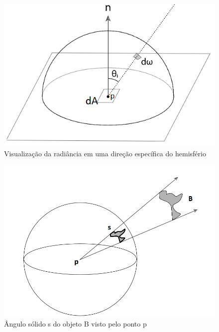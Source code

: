 \documentclass[english, 
               brazil, 
               bsc] %
               {dcomp-abntex2}
\begin{document}
\begin{figure}[h]
        \caption{\label{radiance-img} \small Visualização da radiância em uma direção específica do hemisfério}
        \begin{center}
            \includegraphics[scale=0.5]{./Imagens/irradiance_hemisphere.png}
        \end{center}
\end{figure}




\begin{figure}[htb]
  \caption{\label{solid-angle} \small   Ângulo sólido s do objeto B visto pelo ponto p}
        \begin{center}
            \includegraphics[scale=0.5]{./Imagens/solid_angle.png}
        \end{center}
\end{figure}
\end{document}

